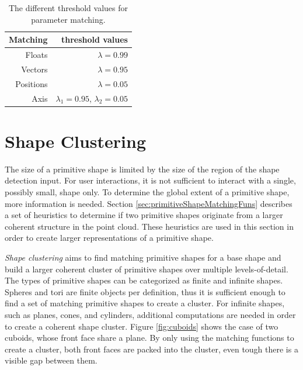 \begin{table}
\centering
\begin{tabular}{ r | r }
    Matching    & threshold values \\
    \hline
  Floats         & $\lambda = 0.99$ \\
    Vectors     & $\lambda = 0.95$ \\
  Positions & $\lambda = 0.05$ \\ 
    Axis             & $\lambda_1 = 0.95$, $\lambda_2 = 0.05$\\  

\end{tabular}
\caption[Different threshold values for parameter matching]
{The different threshold values for parameter matching.}
\label{tab:matchingThresholds}
\end{table}


\section{Shape Clustering}
\label{sec:shapeClustering}

The size of a primitive shape is limited by the size of the region of the shape detection input. For user interactions, it is not sufficient to interact with a single, possibly small, shape only. To determine the global extent of a primitive shape, more information is needed. Section \ref{sec:primitiveShapeMatchingFuns} describes a set of heuristics to determine if two primitive shapes originate from a larger coherent structure in the point cloud. These heuristics are used in this section in order to create larger representations of a primitive shape. 

\textit{Shape clustering} aims to find matching primitive shapes for a base shape and build a larger coherent cluster of primitive shapes over multiple levels-of-detail. The types of primitive shapes can be categorized as finite and infinite shapes. Spheres and tori are finite objects per definition, thus it is sufficient enough to find a set of matching primitive shapes to create a cluster. For infinite shapes, such as planes, cones, and cylinders, additional computations are needed in order to create a coherent shape cluster. Figure \ref{fig:cuboids} shows the case of two cuboids, whose front face share a plane. By only using the matching functions to create a cluster, both front faces are packed into the cluster, even tough there is a visible gap between them.

